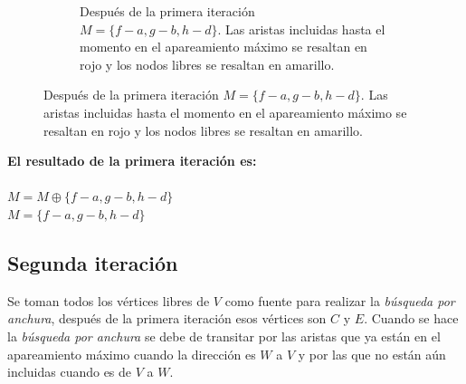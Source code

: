 \documentclass[12pt,a4paper]{article}
\begin{document}
\begin{center}
\begin{figure}[!htb]
\begin{minipage}{.45\linewidth}
\begin{subfigure}[t]{.9\linewidth}
                \captionsetup{justification=centering}
			\captionsetup{belowskip=0pt}
    		\caption{\footnotesize Después de la primera iteración $M=\{f-a,g-b,h-d\}$. Las aristas incluidas hasta el momento en el apareamiento máximo se resaltan en rojo y los nodos libres se resaltan en amarillo.}
                \label{fig:weather_activity}
            \end{subfigure}
        \end{minipage}
\end{figure}
\end{center}

\noindent \textbf{El resultado de la primera iteración es:}\\\\
$M = M \oplus \{f-a,g-b,h-d\}$\\
$M = \{f-a,g-b,h-d\}$

\subsection{Segunda iteración} \noindent
Se toman todos los vértices libres de $V$ como fuente para realizar la \textit{búsqueda por anchura}, después de la primera iteración esos vértices son $C$ y $E$. Cuando se hace la \textit{búsqueda por anchura} se debe de transitar por las aristas que ya están en el apareamiento máximo cuando la dirección es $W$ a $V$ y por las que no están aún incluidas cuando es de $V$ a $W$. 
\end{document}
